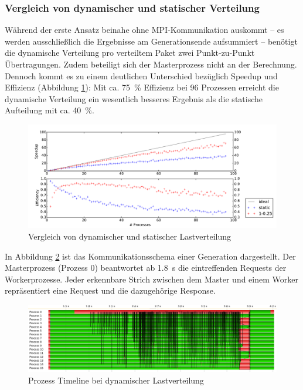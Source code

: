 \subsubsection{Vergleich von dynamischer und statischer Verteilung}
Während der erste Ansatz beinahe ohne MPI-Kommunikation auskommt -- es werden
ausschließlich die Ergebnisse am Generationsende aufsummiert -- benötigt die
dynamische Verteilung pro verteiltem Paket zwei Punkt-zu-Punkt Übertragungen.
Zudem beteiligt sich der Masterprozess nicht an der Berechnung.  Dennoch kommt
es zu einem deutlichen Unterschied bezüglich Speedup und Effizienz (Abbildung
\ref{fig:speedup_final}): Mit ca. \SI{75}{\percent} Effizienz bei 96 Prozessen
erreicht die dynamische Verteilung ein wesentlich besseres Ergebnis als die
statische Aufteilung mit ca. \SI{40}{\percent}.

\begin{figure}
    \centering
    \includegraphics[width=\textwidth]
        {content/img/strong_scaling_time_final.pdf}
    \caption{Vergleich von dynamischer und statischer Lastverteilung}
    \label{fig:speedup_final}
\end{figure}

In Abbildung \ref{fig:vampir_dynamic} ist das Kommunikationsschema einer
Generation dargestellt. Der Masterprozess (Prozess 0) beantwortet ab
\SI{1,8}{\second} die eintreffenden Requests der Workerprozesse. Jeder
erkennbare Strich zwischen dem Master und einem Worker repräsentiert eine
Request und die dazugehörige Response.

\begin{figure}
    \centering
    \includegraphics[width=\textwidth]
        {content/img/vampir_dynamic.png}
        \caption{Prozess Timeline bei dynamischer Lastverteilung}
    \label{fig:vampir_dynamic}
\end{figure}


